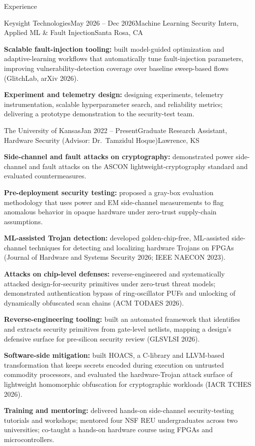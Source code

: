 \begin{rSection}{Experience}

\begin{rSubsection}{Keysight Technologies}{May 2026 -- Dec 2026}{Machine Learning Security Intern, Applied ML \& Fault Injection}{Santa Rosa, CA}
\item \textbf{Scalable fault-injection tooling:} built model-guided optimization and adaptive-learning workflows that automatically tune fault-injection parameters, improving vulnerability-detection coverage over baseline sweep-based flows (GlitchLab, arXiv 2026).
\item \textbf{Experiment and telemetry design:} designing experiments, telemetry instrumentation, scalable hyperparameter search, and reliability metrics; delivering a prototype demonstration to the security-test team.
\end{rSubsection}

\begin{rSubsection}{The University of Kansas}{Jan 2022 -- Present}{Graduate Research Assistant, Hardware Security (Advisor: Dr.\ Tamzidul Hoque)}{Lawrence, KS}
\item \textbf{Side-channel and fault attacks on cryptography:} demonstrated power side-channel and fault attacks on the ASCON lightweight-cryptography standard and evaluated countermeasures.
\item \textbf{Pre-deployment security testing:} proposed a gray-box evaluation methodology that uses power and EM side-channel measurements to flag anomalous behavior in opaque hardware under zero-trust supply-chain assumptions.
\item \textbf{ML-assisted Trojan detection:} developed golden-chip-free, ML-assisted side-channel techniques for detecting and localizing hardware Trojans on FPGAs (Journal of Hardware and Systems Security 2026; IEEE NAECON 2023).
\item \textbf{Attacks on chip-level defenses:} reverse-engineered and systematically attacked design-for-security primitives under zero-trust threat models; demonstrated authentication bypass of ring-oscillator PUFs and unlocking of dynamically obfuscated scan chains (ACM TODAES 2026).
\item \textbf{Reverse-engineering tooling:} built an automated framework that identifies and extracts security primitives from gate-level netlists, mapping a design's defensive surface for pre-silicon security review (GLSVLSI 2026).
\item \textbf{Software-side mitigation:} built HOACS, a C-library and LLVM-based transformation that keeps secrets encoded during execution on untrusted commodity processors, and evaluated the hardware-Trojan attack surface of lightweight homomorphic obfuscation for cryptographic workloads (IACR TCHES 2026).
\item \textbf{Training and mentoring:} delivered hands-on side-channel security-testing tutorials and workshops; mentored four NSF REU undergraduates across two universities; co-taught a hands-on hardware course using FPGAs and microcontrollers.
\end{rSubsection}

\end{rSection}
